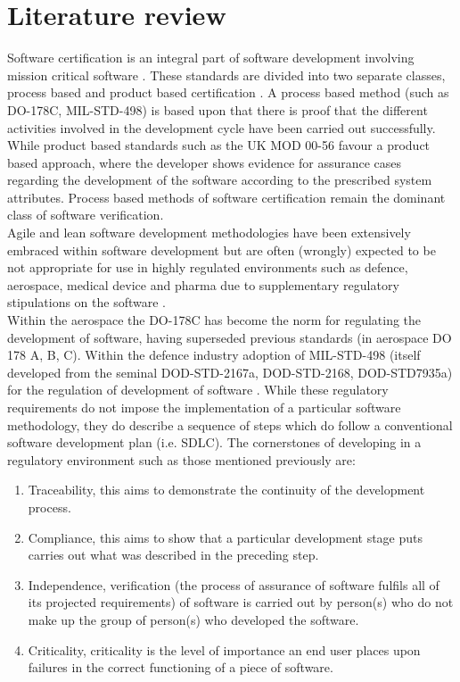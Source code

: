 \documentclass[11pt,twocolumn]{article}
\begin{document}
\section*{\textbf{Literature review}}
Software certification is an integral part of software development involving mission critical software \citep{moy2013testing}. These standards are divided into two separate classes, process based and product based certification \citep{habli2009model}. A process based method (such as DO-178C, MIL-STD-498) is based upon that there is proof that the different activities involved in the development cycle have been carried out successfully. While product based standards such as the UK MOD 00-56 \citep{bowen1993formal} favour a product based approach, where the developer shows evidence for assurance cases regarding the development of the software according to the prescribed system attributes. Process based methods of software certification remain the dominant class of software verification.
\\
Agile and lean software development methodologies have been extensively embraced within software development but are often (wrongly) expected to be not appropriate for use in highly regulated environments such as defence, aerospace, medical device and pharma due to supplementary regulatory stipulations on the software \citep{cawley2013lean}.
\\
Within the aerospace the DO-178C \citep{tuohey2014lessons} has become the norm for regulating the development of software, having superseded previous standards (in aerospace DO 178 A, B, C). Within the defence industry adoption of MIL-STD-498 \citep{gray1999comparison} (itself developed from the seminal DOD-STD-2167a, DOD-STD-2168, DOD-STD7935a) for the regulation of development of software \citep{sheard2001evolution}. While these regulatory requirements do not impose the implementation of a particular software methodology, they do describe a sequence of steps which do follow a conventional software development plan (i.e. SDLC). The cornerstones of developing in a regulatory environment such as those mentioned previously are:
\begin{enumerate}
\item Traceability, this aims to demonstrate the continuity of the development process. 
\item Compliance, this aims to show that a particular development stage puts carries out what was described in the preceding step.
\item Independence, verification (the process of assurance of software fulfils all of its projected requirements) of software is carried out by person(s) who do not make up the group of person(s) who developed the software.
\item Criticality, criticality is the level of importance an end user places upon failures in the correct functioning of a piece of software. 
\end{enumerate}
\end{document}
